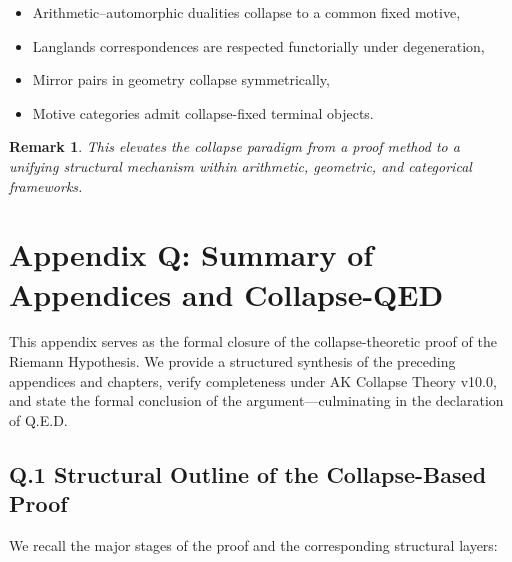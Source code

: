 \documentclass[11pt]{article}
\newtheorem{remark}[theorem]{Remark}
\begin{document}
\begin{itemize}
    \item Arithmetic–automorphic dualities collapse to a common fixed motive,
    \item Langlands correspondences are respected functorially under degeneration,
    \item Mirror pairs in geometry collapse symmetrically,
    \item Motive categories admit collapse-fixed terminal objects.
\end{itemize}

\begin{remark}
This elevates the collapse paradigm from a proof method to a unifying structural mechanism  
within arithmetic, geometric, and categorical frameworks.
\end{remark}



\section*{Appendix Q: Summary of Appendices and Collapse-QED}

This appendix serves as the formal closure of the collapse-theoretic proof of the Riemann Hypothesis.  
We provide a structured synthesis of the preceding appendices and chapters, verify completeness under AK Collapse Theory v10.0,  
and state the formal conclusion of the argument—culminating in the declaration of Q.E.D.

\subsection*{Q.1 Structural Outline of the Collapse-Based Proof}

We recall the major stages of the proof and the corresponding structural layers:
\end{document}
